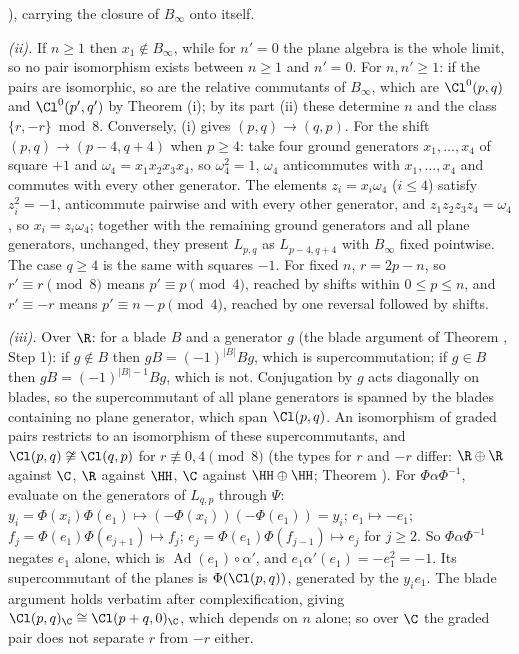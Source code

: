 ), carrying the closure of $B_{\infty}$ onto itself.

\emph{(ii).} If $n \ge 1$ then $x_{1} \notin B_{\infty}$, while for $n' = 0$ the plane algebra is the whole limit, so no pair isomorphism exists between $n \ge 1$ and $n' = 0$. For $n, n' \ge 1$: if the pairs are isomorphic, so are the relative commutants of $B_{\infty}$, which are $\Cl^{0}(p,q)$ and $\Cl^{0}(p',q')$ by Theorem (i); by its part (ii) these determine $n$ and the class $\{r, -r\} \bmod 8$. Conversely, (i) gives $(p,q) \to (q,p)$. For the shift $(p,q) \to (p-4, q+4)$ when $p \ge 4$: take four ground generators $x_{1}, \dots, x_{4}$ of square $+1$ and $\omega_{4} = x_{1}x_{2}x_{3}x_{4}$, so $\omega_{4}^{2} = 1$, $\omega_{4}$ anticommutes with $x_{1}, \dots, x_{4}$ and commutes with every other generator. The elements $z_{i} = x_{i}\omega_{4}$ ($i \le 4$) satisfy $z_{i}^{2} = -1$, anticommute pairwise and with every other generator, and $z_{1}z_{2}z_{3}z_{4} = \omega_{4}$, so $x_{i} = z_{i}\omega_{4}$; together with the remaining ground generators and all plane generators, unchanged, they present $L_{p,q}$ as $L_{p-4,q+4}$ with $B_{\infty}$ fixed pointwise. The case $q \ge 4$ is the same with squares $-1$. For fixed $n$, $r = 2p - n$, so $r' \equiv r \pmod 8$ means $p' \equiv p \pmod 4$, reached by shifts within $0 \le p \le n$, and $r' \equiv -r$ means $p' \equiv n - p \pmod 4$, reached by one reversal followed by shifts.

\emph{(iii).} Over $\R$: for a blade $B$ and a generator $g$ (the blade argument of Theorem , Step 1): if $g \notin B$ then $gB = (-1)^{|B|}Bg$, which is supercommutation; if $g \in B$ then $gB = (-1)^{|B|-1}Bg$, which is not. Conjugation by $g$ acts diagonally on blades, so the supercommutant of all plane generators is spanned by the blades containing no plane generator, which span $\Cl(p,q)$. An isomorphism of graded pairs restricts to an isomorphism of these supercommutants, and $\Cl(p,q) \not\cong \Cl(q,p)$ for $r \not\equiv 0, 4 \pmod 8$ (the types for $r$ and $-r$ differ: $\R \oplus \R$ against $\C$, $\R$ against $\HH$, $\C$ against $\HH \oplus \HH$; Theorem ). For $\Phi\alpha\Phi^{-1}$, evaluate on the generators of $L_{q,p}$ through $\Psi$: $y_{i} = \Phi(x_{i})\Phi(e_{1}) \mapsto (-\Phi(x_{i}))(-\Phi(e_{1})) = y_{i}$; $e_{1} \mapsto -e_{1}$; $f_{j} = \Phi(e_{1})\Phi(e_{j+1}) \mapsto f_{j}$; $e_{j} = \Phi(e_{1})\Phi(f_{j-1}) \mapsto e_{j}$ for $j \ge 2$. So $\Phi\alpha\Phi^{-1}$ negates $e_{1}$ alone, which is $\operatorname{Ad}(e_{1}) \circ \alpha'$, and $e_{1}\alpha'(e_{1}) = -e_{1}^{2} = -1$. Its supercommutant of the planes is $\Phi(\Cl(p,q))$, generated by the $y_{i}e_{1}$. The blade argument holds verbatim after complexification, giving $\Cl(p,q)_{\C} \cong \Cl(p+q, 0)_{\C}$, which depends on $n$ alone; so over $\C$ the graded pair does not separate $r$ from $-r$ either.

